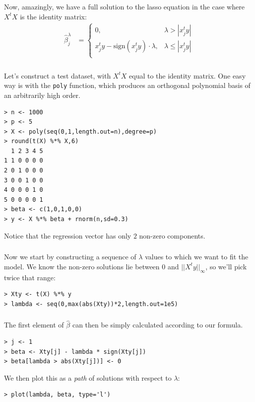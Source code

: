 \begin{frame}[fragile] \frametitle{}

Now, amazingly, we have a full solution to the lasso equation
in the case where $X^t X$ is the identity matrix:
\begin{align*}
\widehat{\beta}^\lambda_j &= \left\{ \begin{array}{ll}
0, &\lambda > |x_j^t y| \\[0pt]
x_j^t y - \text{sign}(x_j^t y) \cdot \lambda, &\lambda \leq |x_j^t y| \\
\end{array} \right.
\end{align*}

\end{frame}

\begin{frame}[fragile] \frametitle{}

Let's construct a test dataset, with $X^tX$ equal
to the identity matrix. One easy way is with the
\texttt{poly} function, which produces an orthogonal
polynomial basis of an arbitrarily high order.
\begin{verbatim}
> n <- 1000
> p <- 5
> X <- poly(seq(0,1,length.out=n),degree=p)
> round(t(X) %*% X,6)
  1 2 3 4 5
1 1 0 0 0 0
2 0 1 0 0 0
3 0 0 1 0 0
4 0 0 0 1 0
5 0 0 0 0 1
> beta <- c(1,0,1,0,0)
> y <- X %*% beta + rnorm(n,sd=0.3)
\end{verbatim}
Notice that the regression vector has only $2$ non-zero components.

\end{frame}

\begin{frame}[fragile] \frametitle{}

Now we start by constructing a sequence of $\lambda$ values
to which we want to fit the model. We know the non-zero solutions
lie between $0$ and $||X^t y||_\infty$, so we'll pick twice that
range:
\begin{verbatim}
> Xty <- t(X) %*% y
> lambda <- seq(0,max(abs(Xty))*2,length.out=1e5)
\end{verbatim}

\end{frame}

\begin{frame}[fragile] \frametitle{}

The first element of $\widehat{\beta}$ can then be
simply calculated according to our formula.
\begin{verbatim}
> j <- 1
> beta <- Xty[j] - lambda * sign(Xty[j])
> beta[lambda > abs(Xty[j])] <- 0
\end{verbatim}
We then plot this as a \textit{path} of solutions with
respect to $\lambda$:
\begin{verbatim}
> plot(lambda, beta, type='l')
\end{verbatim}

\end{frame}

